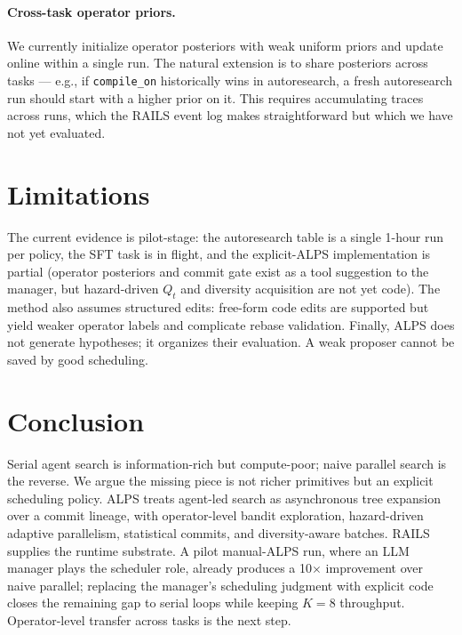 \documentclass{article}
\newcommand{\alps}{ALPS\xspace}
\newcommand{\rails}{RAILS\xspace}
\begin{document}
\paragraph{Cross-task operator priors.}
We currently initialize operator posteriors with weak uniform priors and update online within a single run. The natural extension is to share posteriors across tasks --- e.g., if \texttt{compile\_on} historically wins in autoresearch, a fresh autoresearch run should start with a higher prior on it. This requires accumulating traces across runs, which the \rails event log makes straightforward but which we have not yet evaluated.

\section{Limitations}
\label{sec:limitations}

The current evidence is pilot-stage: the autoresearch table is a single 1-hour run per policy, the SFT task is in flight, and the explicit-\alps implementation is partial (operator posteriors and commit gate exist as a tool suggestion to the manager, but hazard-driven $Q_t$ and diversity acquisition are not yet code). The method also assumes structured edits: free-form code edits are supported but yield weaker operator labels and complicate rebase validation. Finally, \alps does not generate hypotheses; it organizes their evaluation. A weak proposer cannot be saved by good scheduling.

\section{Conclusion}
\label{sec:conclusion}

Serial agent search is information-rich but compute-poor; naive parallel search is the reverse. We argue the missing piece is not richer primitives but an explicit scheduling policy. \alps treats agent-led search as asynchronous tree expansion over a commit lineage, with operator-level bandit exploration, hazard-driven adaptive parallelism, statistical commits, and diversity-aware batches. \rails supplies the runtime substrate. A pilot manual-\alps run, where an LLM manager plays the scheduler role, already produces a 10$\times$ improvement over naive parallel; replacing the manager's scheduling judgment with explicit code closes the remaining gap to serial loops while keeping $K\!=\!8$ throughput. Operator-level transfer across tasks is the next step.
\end{document}
